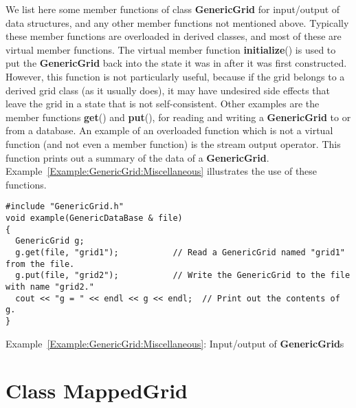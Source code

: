 \documentclass{article}
\newcommand{\Index}[1]{#1\index{#1}}
\begin{document}
We list here some member functions of class \textbf{GenericGrid} for
input/output of data structures, and any other member functions not
mentioned above.  Typically these member functions are overloaded in derived
classes, and most of these are virtual member functions.  The virtual member
function \textbf{initialize}() is used to put the
\textbf{GenericGrid} back into the state it was in after it was first
constructed.  However, this function is not particularly useful, because if
the grid belongs to a derived grid class (as it usually does), it may have
undesired side effects that leave the grid in a state that is not
self-consistent.  Other examples are the member functions
\textbf{get}() and \textbf{put}(), for reading and writing a
\textbf{GenericGrid} to or from a database.  An example of an
overloaded function which is not a virtual function (and not even a member
function) is the stream output operator.  This function prints out a summary
of the data of a \textbf{GenericGrid}.
Example~\ref{Example:GenericGrid:Miscellaneous} illustrates the use of these
functions.

{\small
\begin{verbatim}
#include "GenericGrid.h" 
void example(GenericDataBase & file) 
{ 
  GenericGrid g;
  g.get(file, "grid1");           // Read a GenericGrid named "grid1" from the file.
  g.put(file, "grid2");           // Write the GenericGrid to the file with name "grid2."
  cout << "g = " << endl << g << endl;  // Print out the contents of g.   
}
\end{verbatim}
}
{\center Example~\ref{Example:GenericGrid:Miscellaneous}: Input/output of \textbf{GenericGrid}s\label{Example:GenericGrid:Miscellaneous}}

\section{Class \textbf{\Index{MappedGrid}}}
\label{MappedGrid}
\end{document}
